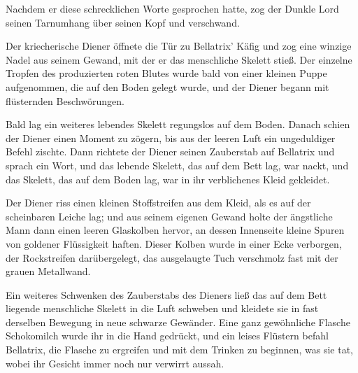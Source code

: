 Nachdem er diese schrecklichen Worte gesprochen hatte, zog der Dunkle Lord seinen Tarnumhang über seinen Kopf und verschwand.

Der kriecherische Diener öffnete die Tür zu Bellatrix’ Käfig und zog eine winzige Nadel aus seinem Gewand, mit der er das menschliche Skelett stieß. Der einzelne Tropfen des produzierten roten Blutes wurde bald von einer kleinen Puppe aufgenommen, die auf den Boden gelegt wurde, und der Diener begann mit flüsternden Beschwörungen.

Bald lag ein weiteres lebendes Skelett regungslos auf dem Boden. Danach schien der Diener einen Moment zu zögern, bis aus der leeren Luft ein ungeduldiger Befehl zischte. Dann richtete der Diener seinen Zauberstab auf Bellatrix und sprach ein Wort, und das lebende Skelett, das auf dem Bett lag, war nackt, und das Skelett, das auf dem Boden lag, war in ihr verblichenes Kleid gekleidet.

Der Diener riss einen kleinen Stoffstreifen aus dem Kleid, als es auf der scheinbaren Leiche lag; und aus seinem eigenen Gewand holte der ängstliche Mann dann einen leeren Glaskolben hervor, an dessen Innenseite kleine Spuren von goldener Flüssigkeit haften. Dieser Kolben wurde in einer Ecke verborgen, der Rockstreifen darübergelegt, das ausgelaugte Tuch verschmolz fast mit der grauen Metallwand.

Ein weiteres Schwenken des Zauberstabs des Dieners ließ das auf dem Bett liegende menschliche Skelett in die Luft schweben und kleidete sie in fast derselben Bewegung in neue schwarze Gewänder. Eine ganz gewöhnliche Flasche Schokomilch wurde ihr in die Hand gedrückt, und ein leises Flüstern befahl Bellatrix, die Flasche zu ergreifen und mit dem Trinken zu beginnen, was sie tat, wobei ihr Gesicht immer noch nur verwirrt aussah.

